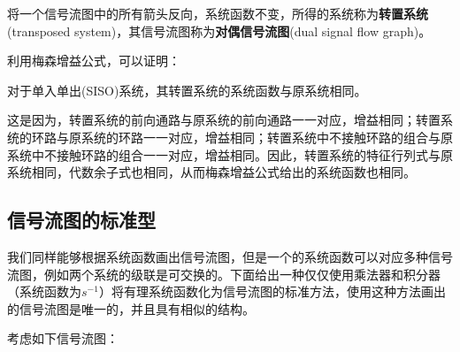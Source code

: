 \begin{definition}[转置系统]
    将一个信号流图中的所有箭头反向，系统函数不变，所得的系统称为\textbf{转置系统}(transposed system)，其信号流图称为\textbf{对偶信号流图}(dual signal flow graph)。
\end{definition}
利用梅森增益公式，可以证明：
\begin{theorem}
    对于单入单出(SISO)系统，其转置系统的系统函数与原系统相同。
\end{theorem}
这是因为，转置系统的前向通路与原系统的前向通路一一对应，增益相同；转置系统的环路与原系统的环路一一对应，增益相同；转置系统中不接触环路的组合与原系统中不接触环路的组合一一对应，增益相同。因此，转置系统的特征行列式与原系统相同，代数余子式也相同，从而梅森增益公式给出的系统函数也相同。

\subsection{信号流图的标准型}\label{sub:standard_form}

我们同样能够根据系统函数画出信号流图，但是一个的系统函数可以对应多种信号流图，例如两个系统的级联是可交换的。下面给出一种仅仅使用乘法器和积分器（系统函数为$s^{-1}$）将有理系统函数化为信号流图的标准方法，使用这种方法画出的信号流图是唯一的，并且具有相似的结构。

考虑如下信号流图：

